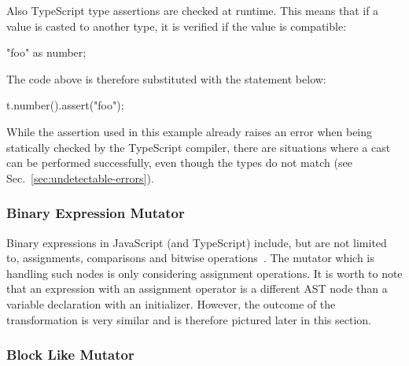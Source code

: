 Also TypeScript type assertions are checked at runtime. This means that if a value is casted to another type, it is verified if the value is compatible:
\begin{JsCode}[numbers=none]
"foo" as number;
\end{JsCode}
The code above is therefore substituted with the statement below:
\begin{JsCode}[numbers=none]
t.number().assert("foo");
\end{JsCode}
While the assertion used in this example already raises an error when being statically checked by the TypeScript compiler, there are situations where a cast can be performed successfully, even though the types do not match (see Sec.~\ref{sec:undetectable-errors}).

\subsubsection{Binary Expression Mutator}

Binary expressions in JavaScript (and TypeScript) include, but are not limited to, assignments, comparisons and bitwise operations~\cite{expressions-and-operators:MDN:2017}. The mutator which is handling such nodes is only considering assignment operations. It is worth to note that an expression with an assignment operator is a different AST node than a variable declaration with an initializer. However, the outcome of the transformation is very similar and is therefore pictured later in this section.

\subsubsection{Block Like Mutator}

